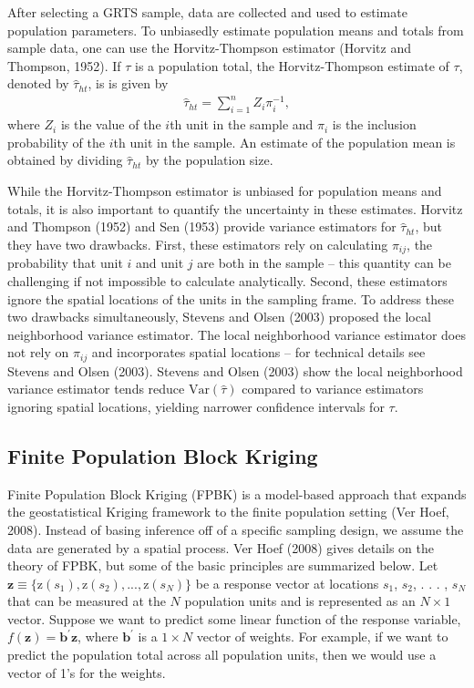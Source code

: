 \documentclass[]{elsarticle} %
\begin{document}
After selecting a GRTS sample, data are collected and used to estimate
population parameters. To unbiasedly estimate population means and
totals from sample data, one can use the Horvitz-Thompson estimator
(Horvitz and Thompson, 1952). If \(\tau\) is a population total, the
Horvitz-Thompson estimate of \(\tau\), denoted by \(\hat{\tau}_{ht}\),
is is given by \begin{align}\label{eq:ht}
  \hat{\tau}_{ht} = \sum_{i = 1}^n Z_i \pi_i^{-1},
\end{align} where \(Z_i\) is the value of the \(i\)th unit in the sample
and \(\pi_i\) is the inclusion probability of the \(i\)th unit in the
sample. An estimate of the population mean is obtained by dividing
\(\hat{\tau}_{ht}\) by the population size.

While the Horvitz-Thompson estimator is unbiased for population means
and totals, it is also important to quantify the uncertainty in these
estimates. Horvitz and Thompson (1952) and Sen (1953) provide variance
estimators for \(\hat{\tau}_{ht}\), but they have two drawbacks. First,
these estimators rely on calculating \(\pi_{ij}\), the probability that
unit \(i\) and unit \(j\) are both in the sample -- this quantity can be
challenging if not impossible to calculate analytically. Second, these
estimators ignore the spatial locations of the units in the sampling
frame. To address these two drawbacks simultaneously, Stevens and Olsen
(2003) proposed the local neighborhood variance estimator. The local
neighborhood variance estimator does not rely on \(\pi_{ij}\) and
incorporates spatial locations -- for technical details see Stevens and
Olsen (2003). Stevens and Olsen (2003) show the local neighborhood
variance estimator tends reduce \(\text{Var}(\hat{\tau})\) compared to
variance estimators ignoring spatial locations, yielding narrower
confidence intervals for \(\tau\).

\hypertarget{finite-population-block-kriging}{%
\subsection{Finite Population Block
Kriging}\label{finite-population-block-kriging}}

Finite Population Block Kriging (FPBK) is a model-based approach that
expands the geostatistical Kriging framework to the finite population
setting (Ver Hoef, 2008). Instead of basing inference off of a specific
sampling design, we assume the data are generated by a spatial process.
Ver Hoef (2008) gives details on the theory of FPBK, but some of the
basic principles are summarized below. Let
\({\mathbf{z} \equiv \{\text{z}(s_1), \text{z}(s_2), . . . , \text{z}(s_N) \}}\)
be a response vector at locations \(s_1\), \(s_2\), . . . , \(s_N\) that
can be measured at the \(N\) population units and is represented as an
\(N \times 1\) vector. Suppose we want to predict some linear function
of the response variable,
\(f(\mathbf{z}) = \mathbf{b}^\prime \mathbf{z}\), where
\(\mathbf{b}^\prime\) is a \(1 \times N\) vector of weights. For
example, if we want to predict the population total across all
population units, then we would use a vector of 1's for the weights.
\end{document}
